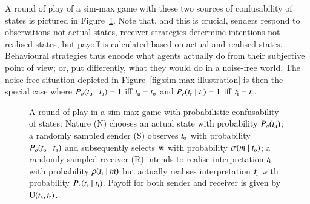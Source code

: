 \documentclass[11pt,english]{article}
\newcommand{\similarity}{\ensuremath{\mathrm{Sim}}} %
\numberwithin{equation}{section}
\begin{document}
\noindent A round of play of a sim-max game with these two sources of confusability of states
is pictured in Figure~\ref{fig:imprecise-sim-max-illustration}. Note that, and this is crucial,
senders respond to observations not actual states, receiver strategies determine intentions not
realised states, but payoff is calculated based on actual and realised states. Behavioural
strategies thus encode what agents actually do from their subjective point of view; or, put
differently, what they would do in a noise-free world. The noise-free situation depicted in
Figure~\ref{fig:sim-max-illustration} is then the special case where
$P_o(t_{\mathrm{o}} \mid t_{\mathrm{a}}) = 1$ iff $t_{\mathrm{a}} = t_{\mathrm{o}}$ and
$P_r(t_{\mathrm{r}} \mid t_{\mathrm{i}}) = 1$ iff $t_{\mathrm{i}} = t_{\mathrm{r}}$.

\begin{figure}
  \centering


  \caption{A round of play in a sim-max game with probabilistic confusability of states: Nature
    (N) chooses an actual state with probability $P_a(t_{\mathrm{a}})$; a randomly sampled sender
    (S) observes $t_{\mathrm{o}}$ with probability $P_o(t_{\mathrm{o}} \mid t_{\mathrm{a}})$ and
    subsequently selects $m$ with probability $\sigma(m \mid t_{\mathrm{o}})$; a
    randomly sampled receiver (R) intends to realise interpretation $t_{\mathrm{i}}$ with
    probability $\rho(t_{\mathrm{i}} \mid m)$ but actually realises interpretation
    $t_{\mathrm{r}}$ with probability $P_r(t_{\mathrm{r}} \mid t_{\mathrm{i}})$. Payoff for both
    sender and receiver is given by $\mathrm{U}(t_{\mathrm{a}}, t_{\mathrm{r}})$.}
  \label{fig:imprecise-sim-max-illustration}
\end{figure}
\end{document}
